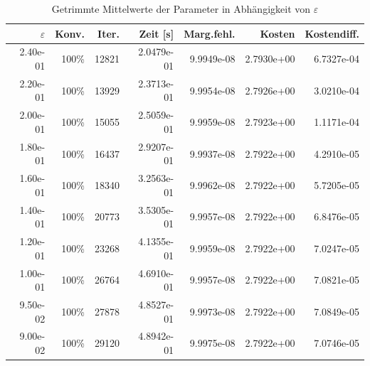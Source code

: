 \begin{table}[htbp]
\caption{Getrimmte Mittelwerte der Parameter in Abhängigkeit von $\varepsilon$}
\label{tab:Parametertest128_2}
\small
\centering
{}
\begin{tabular}{rrrrrrr}
\toprule
$\varepsilon$ & Konv. & Iter. & Zeit [s] & Marg.fehl. & Kosten & Kostendiff. \\
\midrule
2.40e-01 & 100\% & 12821 & 2.0479e-01 & 9.9949e-08 & 2.7930e+00 & 6.7327e-04 \\
2.20e-01 & 100\% & 13929 & 2.3713e-01 & 9.9954e-08 & 2.7926e+00 & 3.0210e-04 \\
2.00e-01 & 100\% & 15055 & 2.5059e-01 & 9.9959e-08 & 2.7923e+00 & 1.1171e-04 \\
1.80e-01 & 100\% & 16437 & 2.9207e-01 & 9.9937e-08 & 2.7922e+00 & 4.2910e-05 \\
1.60e-01 & 100\% & 18340 & 3.2563e-01 & 9.9962e-08 & 2.7922e+00 & 5.7205e-05 \\
1.40e-01 & 100\% & 20773 & 3.5305e-01 & 9.9957e-08 & 2.7922e+00 & 6.8476e-05 \\
1.20e-01 & 100\% & 23268 & 4.1355e-01 & 9.9959e-08 & 2.7922e+00 & 7.0247e-05 \\
1.00e-01 & 100\% & 26764 & 4.6910e-01 & 9.9957e-08 & 2.7922e+00 & 7.0821e-05 \\
9.50e-02 & 100\% & 27878 & 4.8527e-01 & 9.9973e-08 & 2.7922e+00 & 7.0849e-05 \\
9.00e-02 & 100\% & 29120 & 4.8942e-01 & 9.9975e-08 & 2.7922e+00 & 7.0746e-05 \\
\bottomrule
\end{tabular}
\end{table}
